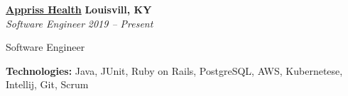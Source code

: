 %
    \headerrow
        {\textbf{\href{https://apprisshealth.com/}{Appriss Health}}}
        {\textbf{Louisvill, KY}}
    \\
    \headerrow
        {\emph{Software Engineer}}
        {\emph{2019 -- Present}}
    \begin{itemize*}
        \item Software Engineer
        \item
        \item
    \end{itemize*}

    \hspace{1.0em}
        {\textbf{Technologies:} Java, JUnit, Ruby on Rails, PostgreSQL, AWS, Kubernetese, Intellij, Git, Scrum}
